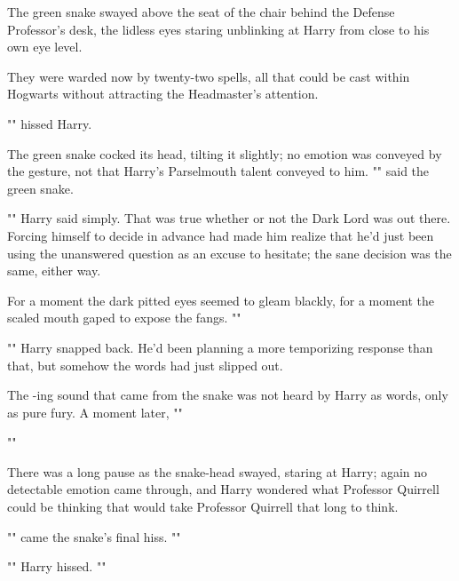 The green snake swayed above the seat of the chair behind the Defense
Professor's desk, the lidless eyes staring unblinking at Harry from close to
his own eye level.

They were warded now by twenty-two spells, all that could be cast within
Hogwarts without attracting the Headmaster's attention.

"" hissed Harry.

The green snake cocked its head, tilting it slightly; no emotion was conveyed
by the gesture, not that Harry's Parselmouth talent conveyed to him.
"" said the green snake.

"" Harry said simply. That was true whether or not the Dark
Lord was out there. Forcing himself to decide in advance had made him realize
that he'd just been using the unanswered question as an excuse to hesitate; the
sane decision was the same, either way.

For a moment the dark pitted eyes seemed to gleam blackly, for a moment the
scaled mouth gaped to expose the fangs. ""

"" Harry snapped back.
He'd been planning a more temporizing response than that, but somehow the words
had just slipped out.

The -ing sound that came from the snake was not heard by Harry as
words, only as pure fury. A moment later, ""

""

There was a long pause as the snake-head swayed, staring at Harry; again no
detectable emotion came through, and Harry wondered what Professor Quirrell
could be thinking that would take Professor Quirrell that long to think.

"" came the snake's final
hiss. ""

"" Harry hissed. ""

